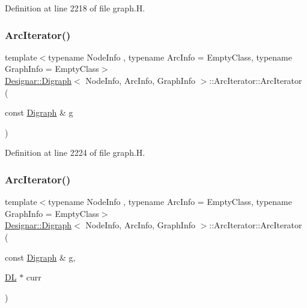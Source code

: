 Definition at line 2218 of file graph.\+H.

\mbox{\label{class_designar_1_1_digraph_1_1_arc_iterator_ac16db42766a60aa488fb4db5492c1361}} 
\subsubsection{\texorpdfstring{Arc\+Iterator()}{ArcIterator()}\hspace{0.1cm}{\footnotesize\ttfamily [2/5]}}
{\footnotesize\ttfamily template$<$typename Node\+Info , typename Arc\+Info  = Empty\+Class, typename Graph\+Info  = Empty\+Class$>$ \\
\hyperlink{class_designar_1_1_digraph}{Designar\+::\+Digraph}$<$ Node\+Info, Arc\+Info, Graph\+Info $>$\+::Arc\+Iterator\+::\+Arc\+Iterator (\begin{DoxyParamCaption}\item[{const \hyperlink{class_designar_1_1_digraph}{Digraph} \&}]{g }\end{DoxyParamCaption})\hspace{0.3cm}{\ttfamily [inline]}}



Definition at line 2224 of file graph.\+H.

\mbox{\label{class_designar_1_1_digraph_1_1_arc_iterator_ae4a8b9172d19134e71693734003ee350}} 
\subsubsection{\texorpdfstring{Arc\+Iterator()}{ArcIterator()}\hspace{0.1cm}{\footnotesize\ttfamily [3/5]}}
{\footnotesize\ttfamily template$<$typename Node\+Info , typename Arc\+Info  = Empty\+Class, typename Graph\+Info  = Empty\+Class$>$ \\
\hyperlink{class_designar_1_1_digraph}{Designar\+::\+Digraph}$<$ Node\+Info, Arc\+Info, Graph\+Info $>$\+::Arc\+Iterator\+::\+Arc\+Iterator (\begin{DoxyParamCaption}\item[{const \hyperlink{class_designar_1_1_digraph}{Digraph} \&}]{g,  }\item[{\hyperlink{class_designar_1_1_d_l}{DL} $\ast$}]{curr }\end{DoxyParamCaption})\hspace{0.3cm}{\ttfamily [inline]}}



